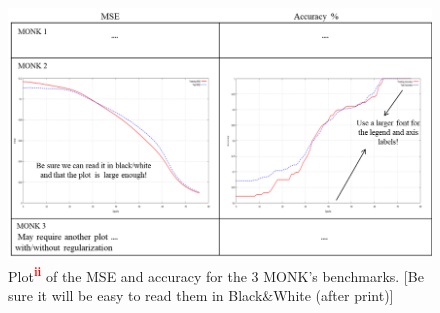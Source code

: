 \documentclass[11pt, letterpaper]{article}  %
\begin{document}
\begin{figure}[h!]
\centering
\includegraphics[width=\textwidth]{monkplot.png}
\caption{Plot\textsuperscript{\textcolor{red}{\textbf{ii}}} of the MSE and accuracy for the 3 MONK’s benchmarks. [Be sure it will be easy to read them in Black\&White (after print)]}
\label{fig:monkplot}
\end{figure}

\newpage
\end{document}
